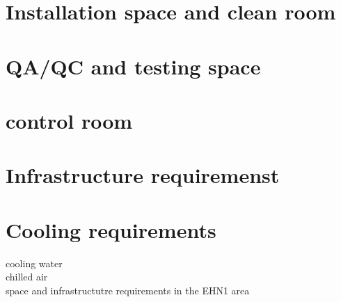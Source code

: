 
\section{Installation space and clean room}


\section{QA/QC and testing space}

\section{control room}


\section{Infrastructure requiremenst}

\section{Cooling requirements}
cooling water \\
chilled air\\



space and infrastructutre requirements in the EHN1 area

